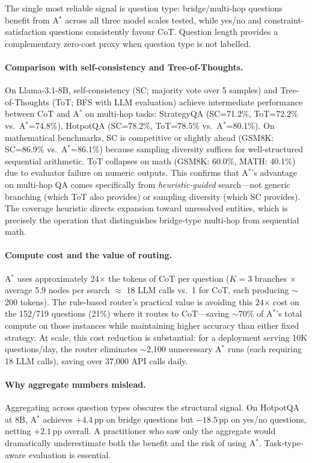 \documentclass{article}
\newcommand{\astar}{A$^*$\xspace}
\begin{document}
The single most reliable signal is question type: bridge/multi-hop questions benefit from \astar across all three model scales tested, while yes/no and constraint-satisfaction questions consistently favour CoT. Question length provides a complementary zero-cost proxy when question type is not labelled.

\paragraph{Comparison with self-consistency and Tree-of-Thoughts.}
On Llama-3.1-8B, self-consistency (SC; majority vote over 5 samples) and Tree-of-Thoughts (ToT; BFS with LLM evaluation) achieve intermediate performance between CoT and \astar on multi-hop tasks: StrategyQA (SC=71.2\%, ToT=72.2\% vs.\ \astar=74.8\%), HotpotQA (SC=78.2\%, ToT=78.5\% vs.\ \astar=80.1\%). On mathematical benchmarks, SC is competitive or slightly ahead (GSM8K: SC=86.9\% vs.\ \astar=86.1\%) because sampling diversity suffices for well-structured sequential arithmetic. ToT collapses on math (GSM8K: 60.0\%, MATH: 40.1\%) due to evaluator failure on numeric outputs. This confirms that \astar's advantage on multi-hop QA comes specifically from \emph{heuristic-guided} search---not generic branching (which ToT also provides) or sampling diversity (which SC provides). The coverage heuristic directs expansion toward unresolved entities, which is precisely the operation that distinguishes bridge-type multi-hop from sequential math.

\paragraph{Compute cost and the value of routing.}
\astar uses approximately 24$\times$ the tokens of CoT per question ($K=3$ branches $\times$ average 5.9 nodes per search $\approx$ 18 LLM calls vs.\ 1 for CoT, each producing $\sim$200 tokens). The rule-based router's practical value is avoiding this 24$\times$ cost on the 152/719 questions (21\%) where it routes to CoT---saving $\sim$70\% of \astar's total compute on those instances while maintaining higher accuracy than either fixed strategy. At scale, this cost reduction is substantial: for a deployment serving 10K questions/day, the router eliminates $\sim$2,100 unnecessary \astar runs (each requiring 18 LLM calls), saving over 37,000 API calls daily.

\paragraph{Why aggregate numbers mislead.}
Aggregating across question types obscures the structural signal. On HotpotQA at 8B, \astar achieves $+4.4$\,pp on bridge questions but $-18.5$\,pp on yes/no questions, netting $+2.1$\,pp overall. A practitioner who saw only the aggregate would dramatically underestimate both the benefit and the risk of using \astar. Task-type-aware evaluation is essential.
\end{document}

